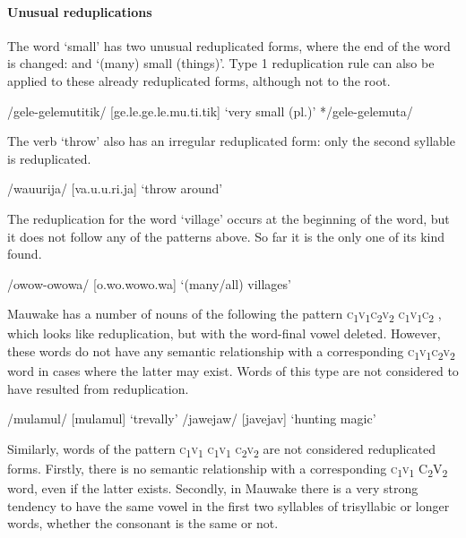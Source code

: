 \paragraph{Unusual reduplications}\label{sec:2:a:z:y:x}

The word  `small' has two unusual reduplicated forms, where the end of the word is changed:  and  `(many) small (things)'.  Type 1 reduplication rule can also be applied to these already reduplicated forms, although not to the root.

\ea
\ea
/gele-gelemutitik/  [ge.{{\textprimstress}}le.ge.{{\textprimstress}}{{\textprimstress}}le.mu.ti.tik]  `very small (pl.)'
\ex
*/gele-gelemuta/
\z
\z

The verb  `throw' also has an irregular reduplicated form: only the second syllable is reduplicated.

\ea
/wa{\textphi}u{\textphi}urija/  [va.{{\textprimstress}}{\textphi}u.{\textphi}u.ri.ja]  `throw around'
\z

The reduplication for the word  `village' occurs at the beginning of the word, but it does not follow any of the patterns above. So far it is the only one of its kind found.

\ea
/owow-owowa/  [o.{{\textprimstress}}wo.wo{{\textprimstress}}{{\textprimstress}}wo.wa]  `(many/all) villages'
\z

Mauwake has a number of nouns of the following the pattern \textsc{c}\textsubscript{1}\textsc{v}\textsubscript{1}\textsc{c}\textsubscript{2}\textsc{v}\textsubscript{2} \textsc{c}\textsubscript{1}\textsc{v}\textsubscript{1}\textsc{c}\textsubscript{2} , which looks like reduplication, but with the word-final vowel deleted.  However, these words do not have any semantic relationship with a corresponding \textsc{c}\textsubscript{1}\textsc{v}\textsubscript{1}\textsc{c}\textsubscript{2}\textsc{v}\textsubscript{2} word in cases where the latter may exist.  Words of this type are not considered to have resulted from reduplication.

\ea
\ea
/mulamul/  [mu{{\textprimstress}lamul}]  `trevally'
\ex
/jawejaw/  [ja{{\textprimstress}vejav}]  `hunting magic'
\z
\z

Similarly, words of the pattern \textsc{c}\textsubscript{1}\textsc{v}\textsubscript{1} \textsc{c}\textsubscript{1}\textsc{v}\textsubscript{1} \textsc{c}\textsubscript{2}\textsc{v}\textsubscript{2} are not considered reduplicated forms.  Firstly, there is no semantic relationship with a corresponding \textsc{c}\textsubscript{1}\textsc{v}\textsubscript{1} C\textsubscript{2}V\textsubscript{2} word, even if the latter exists. Secondly, in Mauwake there is a very strong tendency to have the same vowel in the first two syllables of trisyllabic or longer words, whether the consonant is the same or not. 

